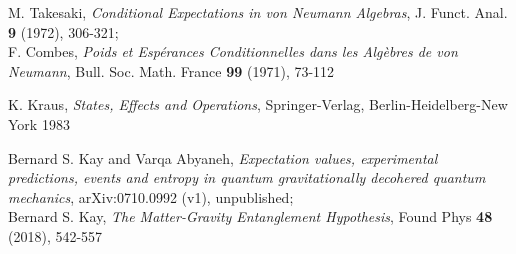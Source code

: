 \documentclass[a4paper,11pt]{article}
\begin{document}
\begin{thebibliography}{References}
 M. Takesaki, \textit{Conditional Expectations in von Neumann Algebras}, J. Funct. Anal. {\bf{9}} (1972), 306-321;\\
F. Combes, \textit{Poids et Esp\'erances Conditionnelles dans les Alg\`ebres de von Neumann}, Bull. Soc. Math. France {\bf{99}} (1971), 73-112

 K. Kraus, \textit{States, Effects and Operations}, Springer-Verlag, Berlin-Heidelberg-New York 1983

  Bernard S. Kay and Varqa Abyaneh, \textit{Expectation values, experimental predictions, events and entropy in quantum gravitationally decohered quantum mechanics}, arXiv:0710.0992 (v1), unpublished;\\
Bernard S. Kay, \textit{The Matter-Gravity Entanglement Hypothesis}, Found Phys {\bf{48}} (2018), 542-557


\end{thebibliography}
\end{document}
